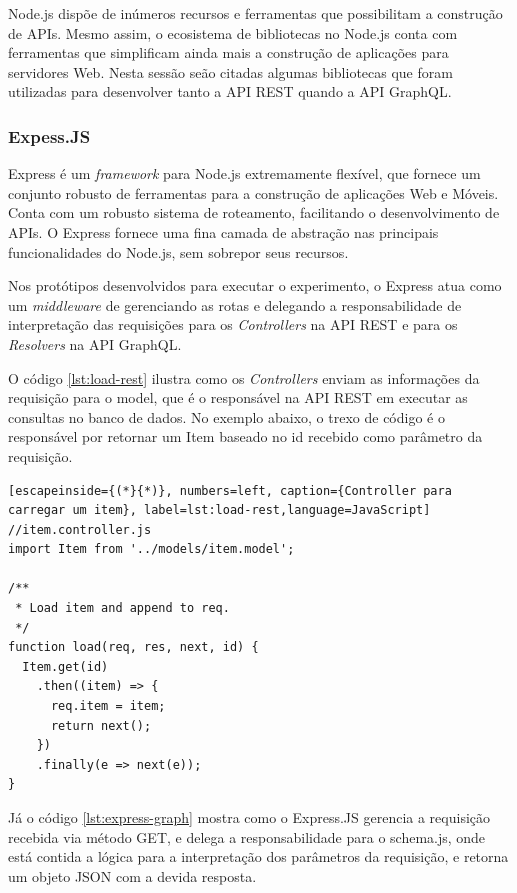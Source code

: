 Node.js dispõe de inúmeros recursos e ferramentas que possibilitam a construção de APIs. Mesmo assim, o ecosistema de bibliotecas no Node.js conta com ferramentas que simplificam ainda mais a construção de aplicações para servidores Web. Nesta sessão seão citadas algumas bibliotecas que foram utilizadas para desenvolver tanto a API REST quando a API GraphQL. 

\subsubsection*{Expess.JS}

Express é um \textit{framework} para Node.js extremamente flexível, que fornece um conjunto robusto de ferramentas para a construção de aplicações Web e Móveis. Conta com um robusto sistema de roteamento, facilitando o desenvolvimento de APIs. O Express fornece uma fina camada de abstração nas principais funcionalidades do Node.js, sem sobrepor seus recursos.

Nos protótipos desenvolvidos para executar o experimento, o Express atua como um \textit{middleware} de gerenciando as rotas e delegando a responsabilidade de interpretação das requisições para os \textit{Controllers} na API REST e para os \textit{Resolvers} na API GraphQL.

O código \ref{lst:load-rest} ilustra como os \textit{Controllers} enviam as informações da requisição para o model, que é o responsável na API REST em executar as consultas no banco de dados. No exemplo abaixo, o trexo de código é o responsável por retornar um \textup{Item} baseado no \textup{id} recebido como parâmetro da requisição.

\begin{lstlisting}[escapeinside={(*}{*)}, numbers=left, caption={Controller para carregar um item}, label=lst:load-rest,language=JavaScript]
//item.controller.js
import Item from '../models/item.model';

/**
 * Load item and append to req.
 */
function load(req, res, next, id) {
  Item.get(id)
    .then((item) => {
      req.item = item;
      return next();
    })
    .finally(e => next(e));
}

\end{lstlisting}

Já o código \ref{lst:express-graph} mostra como o Express.JS gerencia a requisição recebida via método GET, e delega a responsabilidade para o schema.js, onde está contida a lógica para a interpretação dos parâmetros da requisição, e retorna um objeto JSON com a devida resposta.

